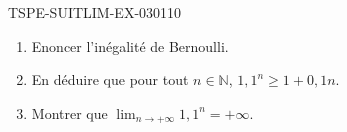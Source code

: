 \begin{exercice}{TSPE-SUITLIM-EX-030}{1}{10}
\begin{enumerate}
  \item Enoncer l'inégalité de Bernoulli.
  \item En déduire que pour tout $n \in \mathbb{N}$, $1{,}1^n \geq 1 + 0{,}1n$.
  \item Montrer que $\lim_{n \to +\infty} 1{,}1^n = +\infty$.
\end{enumerate}
\end{exercice}
